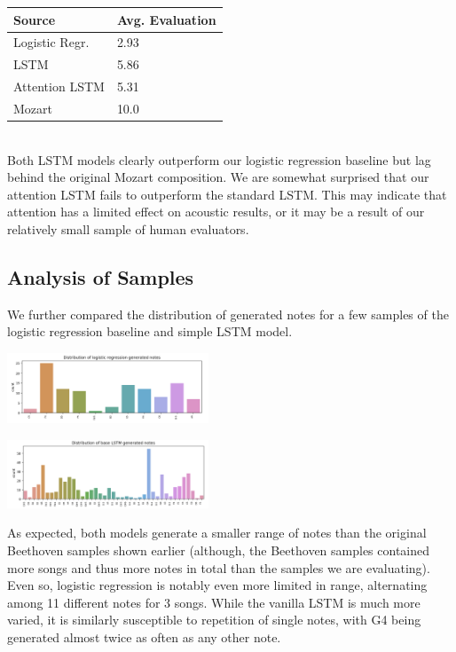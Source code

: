 \documentclass[twoside,twocolumn]{article}
\begin{document}
\begin{tabular}{|l|l|}
\hline
\textbf{Source} & \textbf{Avg. Evaluation} \\ \hline
Logistic Regr.  & 2.93                  \\ \hline
LSTM            & 5.86                  \\ \hline
Attention LSTM  & 5.31                  \\ \hline
Mozart          & 10.0                  \\ \hline
\end{tabular} \\

Both LSTM models clearly outperform our logistic regression baseline but lag behind the original Mozart composition. We are somewhat surprised that our attention LSTM fails to outperform the standard LSTM. This may indicate that attention has a limited effect on acoustic results, or it may be a result of our relatively small sample of human evaluators.

\subsection{Analysis of Samples}
We further compared the distribution of generated notes for a few samples of the logistic regression baseline and simple LSTM model.

\includegraphics[width = 0.45\textwidth]{images/logreg_notes.png}

\includegraphics[width = 0.45\textwidth]{images/simple_lstm_notes.png}

As expected, both models generate a smaller range of notes than the original Beethoven samples shown earlier (although, the Beethoven samples contained more songs and thus more notes in total than the samples we are evaluating). Even so, logistic regression is notably even more limited in range, alternating among 11 different notes for 3 songs. While the vanilla LSTM is much more varied, it is similarly susceptible to repetition of single notes, with G4 being generated almost twice as often as any other note.
\end{document}
